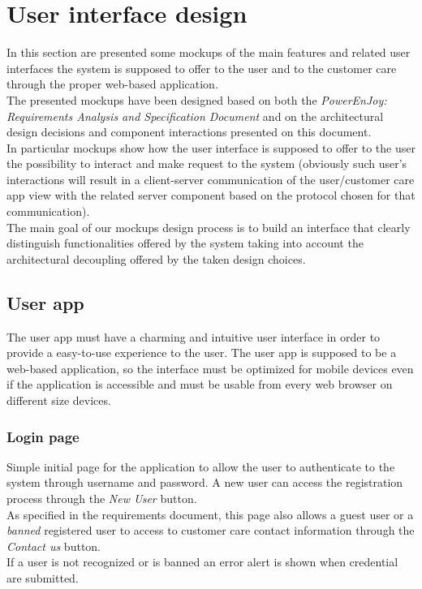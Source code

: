 \section{User interface design}
In this section are presented some mockups of the main features and related user interfaces the system is supposed to offer to the user and to the customer care through the proper web-based application. \\

The presented mockups have been designed based on both the \emph{PowerEnJoy: Requirements Analysis and Specification Document}\cite{RASD} and on the architectural design decisions and component interactions presented on this document. \\
In particular mockups show how the user interface is supposed to offer to the user the possibility to interact and make request to the system (obviously such user's interactions will result in a client-server communication of the user/customer care app view with the related server component based on the protocol chosen for that communication).  \\

The main goal of our mockups design process is to build an interface that clearly distinguish functionalities offered by the system taking into account the architectural decoupling offered by the taken design choices. \\

\clearpage

\subsection{User app}
The user app must have a charming and intuitive user interface in order to provide a easy-to-use experience to the user. The user app is supposed to be a web-based application, so the interface must be optimized for mobile devices even if the application is accessible and must be usable from every web browser on different size devices.

\subsubsection{Login page}
Simple initial page for the application to allow the user to authenticate to the system through username and password. A new user can access the registration process through the \emph{New User} button. \\
As specified in the requirements document, this page also allows a guest user or a \emph{banned} registered user to access to customer care contact information through the \emph{Contact us} button. \\
If a user is not recognized or is banned an error alert is shown when credential are submitted.

